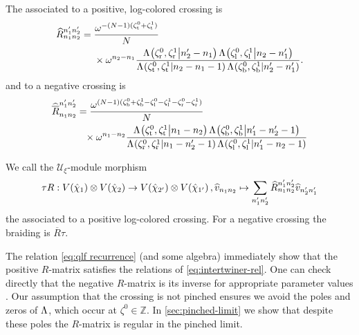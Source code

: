 \documentclass{sl2ams}
\numberwithin{equation}{section}
\newcommand{\ZZ}{\mathbb{Z}}
\newcommand{\U}{\mathcal{U}}
\begin{document}
\begin{definition}
  \label{def:R-mat}
  The  associated to a positive, log-colored crossing is
  \begin{equation}
    \label{eq:R-mat-positive}
    \begin{aligned}
      \widehat R_{n_1 n_2}^{n_1' n_2'}
      =
      {}
      &\frac{
        \omega^{-(\nr-1)(\zeta_{\lW}^0 + \zeta_{\lW}^1)}
      }{
        \nr
      }
      \\
      &\times
      \omega^{n_2 - n_1}
      \frac{
        \qlf{\zeta_{\lN}^0, \zeta_{\lN}^1}{n_2' - n_1}
        \qlf{\zeta_{\lS}^0, \zeta_{\lS}^1}{n_2 - n_1'}
        }{
          \qlf{\zeta_{\lW}^0, \zeta_{\lW}^1}{n_2 - n_1 - 1}
          \qlf{\zeta_{\lE}^0, \zeta_{\lE}^1}{n_2' - n_1'}
      }.
    \end{aligned}
  \end{equation}
  and to a negative crossing is
  \begin{equation}
    \label{eq:R-mat-negative}
    \begin{aligned}
      \rmatm{n_1}{n_2}{n_1'}{n_2'}
      &=
      \frac{
        \omega^{(\nr-1)(\zeta_{\lE}^0 + \zeta_{\lE}^1 - \zeta_{\lS}^0 -  \zeta_{\lS}^1 -  \zeta_{\lN}^0 - \zeta_{\lN}^1)}
        }{
        \nr
      }
      \\
      &\phantom{=}\times
      \omega^{n_1 - n_2}
      \frac{
        \qlf{\zeta_{\lW}^0, \zeta_{\lW}^1}{n_1 - n_2}
        \qlf{\zeta_{\lE}^0, \zeta_{\lE}^1}{n_1' - n_2' - 1}
      }{
        \qlf{\zeta_{\lN}^0, \zeta_{\lN}^1}{n_1 - n_2' - 1}
        \qlf{\zeta_{\lS}^0, \zeta_{\lS}^1}{n_1' - n_2 - 1}
      }
    \end{aligned}
  \end{equation}

  We call the \(\U_\xi\)-module morphism
  \begin{equation}
    \label{eq:braiding}
    \tau R : 
    \rep{\hat{\chi}_{1}}
    \otimes
    \rep{\hat{\chi}_{2}}
    \to
    \rep{\hat{\chi}_{2'}}
    \otimes
    \rep{\hat{\chi}_{1'}},
    \vbh{n_{1} n_{2}}
    \mapsto
    \sum_{n_{1}' n_{2}'}
    \rmat{n_{1}}{n_{2}}{n_{1}'}{n_{2}'}
    \vbh{n_{2}' n_{1}'}
  \end{equation}
  the  associated to a positive log-colored crossing.
  For a negative crossing the braiding is \(\overline{R} \tau\).
\end{definition}

The relation \eqref{eq:qlf recurrence} (and some algebra) immediately show that the positive \(R\)-matrix satisfies the relations of \cref{eq:intertwiner-rel}.
One can check directly that the negative \(R\)-matrix is its inverse for appropriate parameter values \cite{McPhailSnyderVolume}.
Our assumption that the crossing is not pinched ensures we avoid the poles and zeros of \(\Lambda\), which occur at \(\zeta^0 \in \ZZ\).
In \cref{sec:pinched-limit} we show that despite these poles the \(R\)-matrix is regular in the pinched limit.
\end{document}
